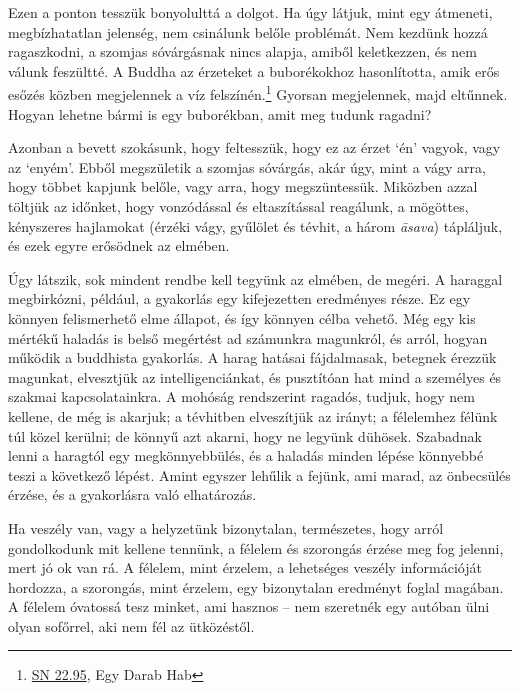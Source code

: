 
Ezen a ponton tesszük bonyolulttá a dolgot. Ha úgy látjuk, mint egy
átmeneti, megbízhatatlan jelenség, nem csinálunk belőle problémát. Nem
kezdünk hozzá ragaszkodni, a szomjas sóvárgásnak nincs alapja, amiből
keletkezzen, és nem válunk feszültté. A Buddha az érzeteket a
buborékokhoz hasonlította, amik erős esőzés közben megjelennek a víz
felszínén.\footnote{\href{https://suttacentral.net/sn22.95}{SN 22.95},
  Egy Darab Hab} Gyorsan megjelennek, majd eltűnnek. Hogyan lehetne
bármi is egy buborékban, amit meg tudunk ragadni?

Azonban a bevett szokásunk, hogy feltesszük, hogy ez az érzet `én'
vagyok, vagy az `enyém'. Ebből megszületik a szomjas sóvárgás, akár úgy,
mint a vágy arra, hogy többet kapjunk belőle, vagy arra, hogy
megszüntessük. Miközben azzal töltjük az időnket, hogy vonzódással és
eltaszítással reagálunk, a mögöttes, kényszeres hajlamokat (érzéki vágy,
gyűlölet és tévhit, a három \emph{āsava}) tápláljuk, és ezek egyre
erősödnek az elmében.

Úgy látszik, sok mindent rendbe kell tegyünk az elmében, de megéri. A
haraggal megbirkózni, például, a gyakorlás egy kifejezetten eredményes
része. Ez egy könnyen felismerhető elme állapot, és így könnyen célba
vehető. Még egy kis mértékű haladás is belső megértést ad számunkra
magunkról, és arról, hogyan működik a buddhista gyakorlás. A harag
hatásai fájdalmasak, betegnek érezzük magunkat, elvesztjük az
intelligenciánkat, és pusztítóan hat mind a személyes és szakmai
kapcsolatainkra. A mohóság rendszerint ragadós, tudjuk, hogy nem
kellene, de még is akarjuk; a tévhitben elveszítjük az irányt; a
félelemhez félünk túl közel kerülni; de könnyű azt akarni, hogy ne
legyünk dühösek. Szabadnak lenni a haragtól egy megkönnyebbülés, és a
haladás minden lépése könnyebbé teszi a következő lépést. Amint egyszer
lehűlik a fejünk, ami marad, az önbecsülés érzése, és a gyakorlásra való
elhatározás.

\clearpage


Ha veszély van, vagy a helyzetünk bizonytalan, természetes, hogy arról
gondolkodunk mit kellene tennünk, a félelem és szorongás érzése meg fog
jelenni, mert jó ok van rá. A félelem, mint érzelem, a lehetséges
veszély információját hordozza, a szorongás, mint érzelem, egy
bizonytalan eredményt foglal magában. A félelem óvatossá tesz minket,
ami hasznos -- nem szeretnék egy autóban ülni olyan sofőrrel, aki nem
fél az ütközéstől.

